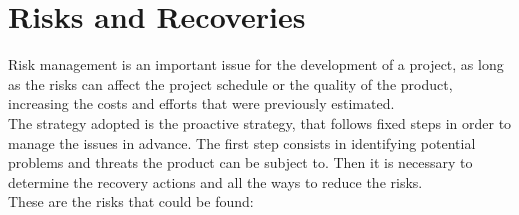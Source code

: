 \newpage
\section{Risks and Recoveries}
	Risk management is an important issue for the development of a project, as long as the risks can affect the project schedule or the quality of the product, increasing the costs and efforts that were previously estimated. \\ The strategy adopted is the proactive strategy, that follows fixed steps in order to manage the issues in advance. The first step consists in identifying potential problems and threats the product can be subject to. Then it is necessary to determine the recovery actions and all the ways to reduce the risks.\\ These are the risks that could be found:
